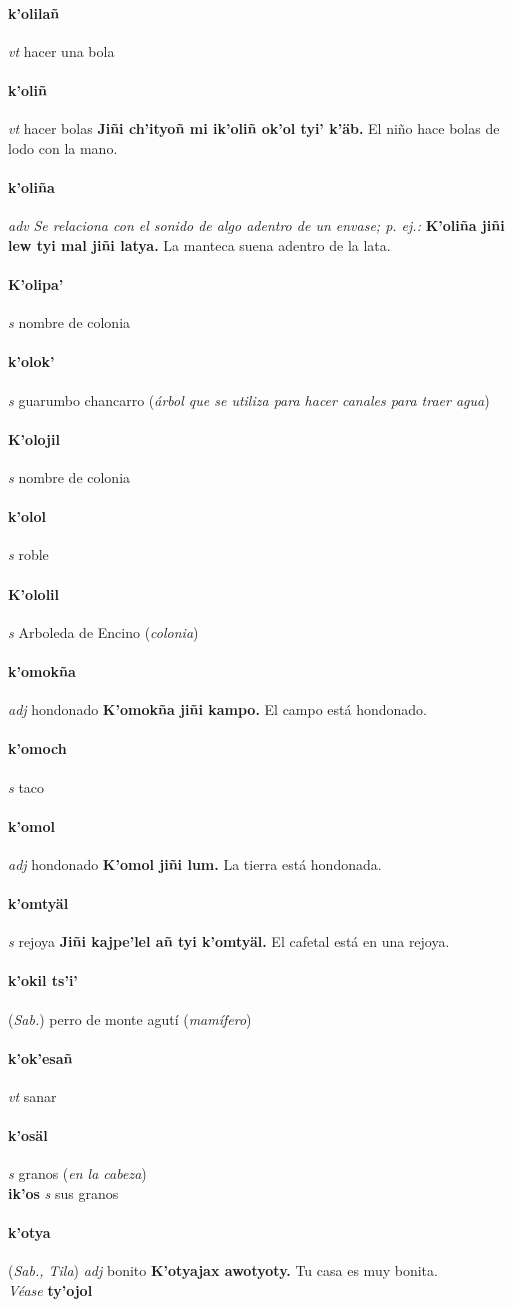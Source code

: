 \documentclass{scrbook}
\newcommand{\entry}[1]{\paragraph{#1}}
\newcommand{\nontranslationdef}[1]{\textit{#1}}
\newcommand{\partofspeech}[1]{\textit{#1}}
\newcommand{\spanishtranslation}[1]{#1}
\newcommand{\clarification}[1]{(\textit{#1})}
\newcommand{\cholexample}[1]{\textbf{#1}}
\newcommand{\exampletranslation}[1]{#1}
\newcommand{\alsosee}[1]{\\\textit{Véase} \textbf{#1}}
\newcommand{\relevantdialect}[1]{(\textit{#1})}
\newcommand{\secondaryentry}[1]{\\\textbf{#1}}
\newcommand{\secondpartofspeech}[1]{\textit{#1}}
\newcommand{\secondtranslation}[1]{#1}
\begin{document}
\begin{multicols}{2}
\entry{k'olilañ}
\partofspeech{vt}
\spanishtranslation{hacer una bola}

\entry{k'oliñ}
\partofspeech{vt}
\spanishtranslation{hacer bolas}
\cholexample{Jiñi ch'ityoñ mi ik'oliñ ok'ol tyi' k'äb.}
\exampletranslation{El niño hace bolas de lodo con la mano.}

\entry{k'oliña}
\partofspeech{adv}
\nontranslationdef{Se relaciona con el sonido de algo adentro de un envase; p. ej.:}
\cholexample{K'oliña jiñi lew tyi mal jiñi latya.}
\exampletranslation{La manteca suena adentro de la lata.}

\entry{K'olipa'}
\partofspeech{s}
\spanishtranslation{nombre de colonia}

\entry{k'olok'}
\partofspeech{s}
\spanishtranslation{guarumbo}
\spanishtranslation{chancarro}
\clarification{árbol que se utiliza para hacer canales para traer agua}

\entry{K'olojil}
\partofspeech{s}
\spanishtranslation{nombre de colonia}

\entry{k'olol}
\partofspeech{s}
\spanishtranslation{roble}

\entry{K'ololil}
\partofspeech{s}
\spanishtranslation{Arboleda de Encino}
\clarification{colonia}

\entry{k'omokña}
\partofspeech{adj}
\spanishtranslation{hondonado}
\cholexample{K'omokña jiñi kampo.}
\exampletranslation{El campo está hondonado.}

\entry{k'omoch}
\partofspeech{s}
\spanishtranslation{taco}

\entry{k'omol}
\partofspeech{adj}
\spanishtranslation{hondonado}
\cholexample{K'omol jiñi lum.}
\exampletranslation{La tierra está hondonada.}

\entry{k'omtyäl}
\partofspeech{s}
\spanishtranslation{rejoya}
\cholexample{Jiñi kajpe'lel añ tyi k'omtyäl.}
\exampletranslation{El cafetal está en una rejoya.}

\entry{k'okil ts'i'}
\relevantdialect{Sab.}
\spanishtranslation{perro de monte}
\spanishtranslation{agutí}
\clarification{mamífero}

\entry{k'ok'esañ}
\partofspeech{vt}
\spanishtranslation{sanar}

\entry{k'osäl}
\partofspeech{s}
\spanishtranslation{granos}
\clarification{en la cabeza}
\secondaryentry{ik'os}
\secondpartofspeech{s}
\secondtranslation{sus granos}

\entry{k'otya}
\relevantdialect{Sab., Tila}
\partofspeech{adj}
\spanishtranslation{bonito}
\cholexample{K'otyajax awotyoty.}
\exampletranslation{Tu casa es muy bonita.}
\alsosee{ty'ojol}


\end{multicols}
\end{document}
